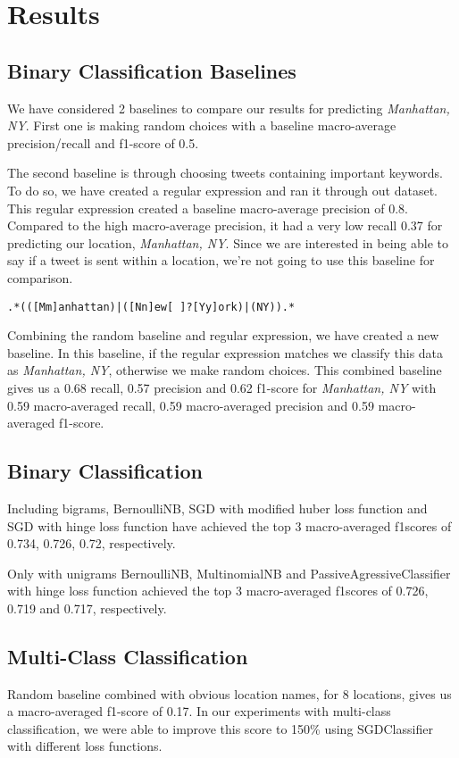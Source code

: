 \documentclass[twoside,11pt]{article}
\begin{document}
\section{Results}

\subsection{Binary Classification Baselines}
We have considered 2 baselines to compare our results for predicting \textit{Manhattan, NY}. First one is making random choices with a baseline macro-average precision/recall and f1-score of 0.5.

The second baseline is through choosing tweets containing important keywords. To do so, we have created a regular expression and ran it through out dataset. This regular expression created a baseline macro-average precision of 0.8. Compared to the high macro-average precision, it had a very low recall 0.37 for predicting our location, \textit{Manhattan, NY}. Since we are interested in being able to say if a tweet is sent within a location, we're not going to use this baseline for comparison.

\begin{verbatim}
.*(([Mm]anhattan)|([Nn]ew[ ]?[Yy]ork)|(NY)).*
\end{verbatim} 


Combining the random baseline and regular expression, we have created a new baseline. In this baseline, if the regular expression matches we classify this data as \textit{Manhattan, NY}, otherwise we make random choices. This combined baseline gives us a 0.68 recall, 0.57 precision and 0.62 f1-score for \textit{Manhattan, NY} with 0.59 macro-averaged recall, 0.59 macro-averaged precision and 0.59 macro-averaged f1-score. 

\subsection{Binary Classification}

Including bigrams, BernoulliNB, SGD with modified huber loss function and SGD with hinge loss function have achieved the top 3 macro-averaged f1scores of 0.734, 0.726, 0.72, respectively. 

Only with unigrams BernoulliNB, MultinomialNB and PassiveAgressiveClassifier with hinge loss function achieved the top 3 macro-averaged f1scores of 0.726, 0.719 and 0.717, respectively. 

\subsection{Multi-Class Classification}
Random baseline combined with obvious location names, for 8 locations, gives us a macro-averaged f1-score of  0.17. In our experiments with multi-class classification, we were able to improve this score to 150\% using SGDClassifier with different loss functions.
\end{document}
